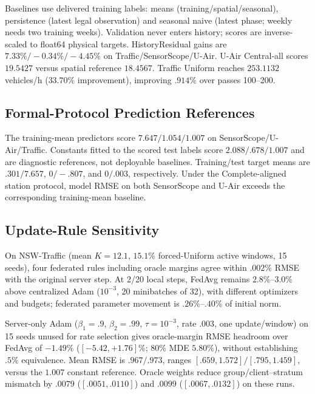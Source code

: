 Baselines use delivered training labels: means (training/spatial/seasonal),
persistence (latest legal observation) and seasonal naive (latest phase;
weekly needs two training weeks). Validation never enters history; scores
are inverse-scaled to float64 physical targets. HistoryResidual gains are
$7.33\%/-0.34\%/-4.45\%$ on Traffic/SensorScope/U-Air. U-Air Central-all
scores $19.5427$ versus spatial reference $18.4567$. Traffic Uniform reaches
$253.1132$ vehicles/h ($33.70\%$ improvement), improving $.914\%$ over passes 100--200.

\subsection{Formal-Protocol Prediction References}

The training-mean predictors score $7.647/1.054/1.007$ on
SensorScope/U-Air/Traffic.  Constants fitted to the scored test labels score
$2.088/.678/1.007$ and are diagnostic references, not deployable baselines.
Training/test target means are $.301/7.657$, $0/-.807$, and $0/.003$,
respectively. Under the Complete-aligned station protocol, model RMSE on
both SensorScope and U-Air exceeds the corresponding training-mean baseline.

\subsection{Update-Rule Sensitivity}

On NSW-Traffic (mean $K=12.1$, $15.1\%$ forced-Uniform active windows,
15 seeds), four federated rules including oracle margins agree within
$.002\%$ RMSE with the original server step. At 2/20 local steps, FedAvg
remains $2.8\%$--$3.0\%$ above centralized Adam ($10^{-3}$, 20 minibatches
of 32), with different optimizers and budgets; federated parameter movement is
$.26\%$--$.40\%$ of initial norm.

Server-only Adam ($\beta_1=.9$, $\beta_2=.99$, $\tau=10^{-3}$, rate $.003$,
one update/window) on 15 seeds unused for rate selection gives oracle-margin
RMSE headroom over FedAvg of $-1.49\%$ ($[-5.42,+1.76]\%$; 80\% MDE
$5.80\%$), without establishing $.5\%$ equivalence. Mean RMSE is
$.967/.973$, ranges $[.659,1.572]/[.795,1.459]$, versus the $1.007$ constant
reference. Oracle weights reduce group/client--stratum mismatch by
$.0079$ ($[.0051,.0110]$) and $.0099$ ($[.0067,.0132]$) on these runs.


